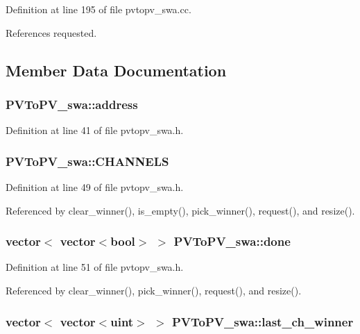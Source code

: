 Definition at line 195 of file pvtopv\_\-swa.cc.

References requested.

\subsection{Member Data Documentation}
\subsubsection[{address}]{ {\bf PVToPV\_\-swa::address}}\label{classPVToPV__swa_f6614400b4aa4b0c920a2d0a567ce42d}




Definition at line 41 of file pvtopv\_\-swa.h.
\subsubsection[{CHANNELS}]{ {\bf PVToPV\_\-swa::CHANNELS}\hspace{0.3cm}{\tt  [private]}}\label{classPVToPV__swa_35e1fc55bc9874e44b966e067374dea1}




Definition at line 49 of file pvtopv\_\-swa.h.

Referenced by clear\_\-winner(), is\_\-empty(), pick\_\-winner(), request(), and resize().
\subsubsection[{done}]{\setlength{\rightskip}{0pt plus 5cm}vector$<$ vector$<$bool$>$ $>$ {\bf PVToPV\_\-swa::done}\hspace{0.3cm}{\tt  [private]}}\label{classPVToPV__swa_2a380023d1ca2bf3bafedc25df27bf43}




Definition at line 51 of file pvtopv\_\-swa.h.

Referenced by clear\_\-winner(), pick\_\-winner(), request(), and resize().
\subsubsection[{last\_\-ch\_\-winner}]{\setlength{\rightskip}{0pt plus 5cm}vector$<$ vector$<${\bf uint}$>$ $>$ {\bf PVToPV\_\-swa::last\_\-ch\_\-winner}\hspace{0.3cm}{\tt  [private]}}\label{classPVToPV__swa_430aa8ba7469ba353cf3e4a802d67090}




